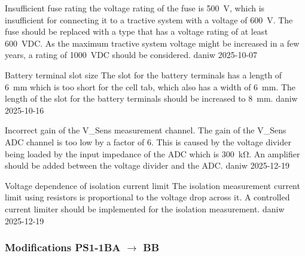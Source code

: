 \begin{ModTable}
\ModItemDone
{Insufficient fuse rating}
{the voltage rating of the fuse is \qty{500}{\volt}, which is insufficient for connecting it to a tractive system with a voltage of \qty{600}{\volt}. }
{The fuse should be replaced with a type that has a voltage rating of at least \qty{600}{\volt}DC. As the maximum tractive system voltage might be increased in a few years, a rating of \qty{1000}{\volt}DC should be considered. }
{daniw}
{2025-10-07}

\ModItemDone
{Battery terminal slot size}
{The slot for the battery terminals has a length of \qty{6}{\milli\meter} which is too short for the cell tab, which also has a width of \qty{6}{\milli\meter}. }
{The length of the slot for the battery terminals should be increased to \qty{8}{\milli\meter}. }
{daniw}
{2025-10-16}

\ModItemDone
{Incorrect gain of the V\_Sens measurement channel. }
{The gain of the V\_Sens \ac{ADC} channel is too low by a factor of 6. This is caused by the voltage divider being loaded by the input impedance of the \ac{ADC} which is \qty{300}{\kilo\ohm}. }
{An amplifier should be added between the voltage divider and the \ac{ADC}. }
{daniw}
{2025-12-19}

\ModItemDone
{Voltage dependence of isolation current limit}
{The isolation measurement current limit using resistors is proportional to the voltage drop across it. }
{A controlled current limiter should be implemented for the isolation measurement. }
{daniw}
{2025-12-19}

\end{ModTable}

\FloatBarrier

\subsubsection{Modifications PS1-1BA $\to$ BB}


